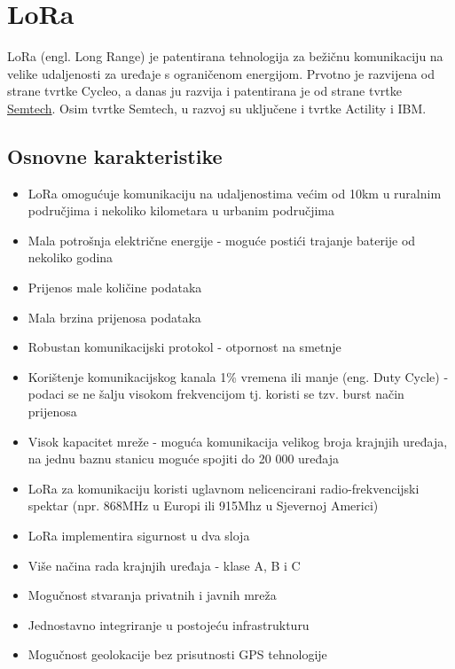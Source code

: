 \chapter{LoRa}
\label{chapter:lora}
LoRa (engl. Long Range) je patentirana tehnologija za bežičnu komunikaciju na velike udaljenosti za uređaje s ograničenom energijom. Prvotno je razvijena od strane tvrtke Cycleo, a danas ju razvija i patentirana je od strane tvrtke \href{https://www.semtech.com}{Semtech}. Osim tvrtke Semtech, u razvoj su uključene i tvrtke Actility  i IBM.

\section{Osnovne karakteristike}
\label{subsection:osnovno}
\begin{itemize}
\item LoRa omogućuje komunikaciju na udaljenostima većim od 10km u ruralnim područjima i nekoliko kilometara u urbanim područjima
\item Mala potrošnja električne energije - moguće postići trajanje baterije od nekoliko godina
\item Prijenos male količine podataka
\item Mala brzina prijenosa podataka
\item Robustan komunikacijski protokol - otpornost na smetnje
\item Korištenje komunikacijskog kanala 1\% vremena ili manje (eng. Duty Cycle) - podaci se ne šalju visokom frekvencijom tj. koristi se tzv. burst način prijenosa
\item Visok kapacitet mreže - moguća komunikacija velikog broja krajnjih uređaja, na jednu baznu stanicu moguće spojiti do 20 000 uređaja
\item  LoRa za komunikaciju koristi uglavnom nelicencirani radio-frekvencijski spektar (npr. 868MHz u Europi ili 915Mhz u Sjevernoj Americi)
\item LoRa implementira sigurnost u dva sloja
\item Više načina rada krajnjih uređaja - klase A, B i C
\item Mogučnost stvaranja privatnih i javnih mreža
\item Jednostavno integriranje u postojeću infrastrukturu
\item Mogučnost geolokacije bez prisutnosti GPS tehnologije
\end{itemize}

